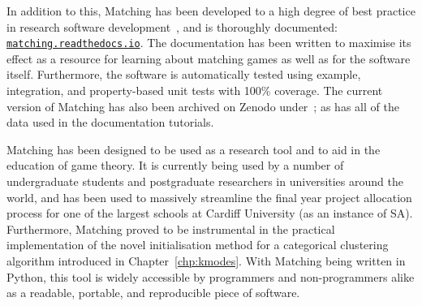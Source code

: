 In addition to this, Matching has been developed to a high degree of best
practice in research software development~\cite{Jimenez2017}, and is thoroughly
documented:
\href{https://matching.readthedocs.io}{\nolinkurl{matching.readthedocs.io}}. The
documentation has been written to maximise its effect as a resource for learning
about matching games as well as for the software itself. Furthermore, the
software is automatically tested using example, integration, and property-based
unit tests with 100\% coverage. The current version of Matching has also been
archived on Zenodo under~; as has all of the data
used in the documentation tutorials.

Matching has been designed to be used as a research tool and to aid in the
education of game theory. It is currently being used by a number of
undergraduate students and postgraduate researchers in universities around the
world, and has been used to massively streamline the final year project
allocation process for one of the largest schools at Cardiff University (as an
instance of SA). Furthermore, Matching proved to be instrumental in the
practical implementation of the novel initialisation method for a categorical
clustering algorithm introduced in Chapter~\ref{chp:kmodes}. With Matching being
written in Python, this tool is widely accessible by programmers and
non-programmers alike as a readable, portable, and reproducible piece of
software.
